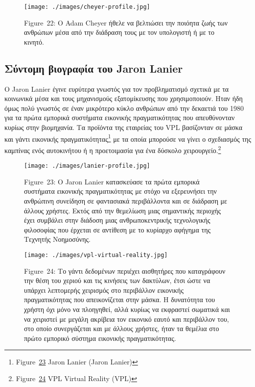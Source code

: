 \documentclass[
]{article}
\begin{document}
\leavevmode{}%
\begin{figure}
\hypertarget{fig:adam-cheyer-profile}{%
\centering
\texttt{[image: ./images/cheyer-profile.jpg]}
\caption{Figure~22: Ο Adam Cheyer ήθελε να βελτιώσει την ποιόητα ζωής
των ανθρώπων μέσα από την διάδραση τους με τον υπολογιστή ή με το
κινητό.}\label{fig:adam-cheyer-profile}
}
\end{figure}

\hypertarget{ux3c3ux3cdux3bdux3c4ux3bfux3bcux3b7-ux3b2ux3b9ux3bfux3b3ux3c1ux3b1ux3c6ux3afux3b1-ux3c4ux3bfux3c5-jaron-lanier}{%
\subsection{Σύντομη βιογραφία του Jaron
Lanier}\label{ux3c3ux3cdux3bdux3c4ux3bfux3bcux3b7-ux3b2ux3b9ux3bfux3b3ux3c1ux3b1ux3c6ux3afux3b1-ux3c4ux3bfux3c5-jaron-lanier}}

Ο Jaron Lanier έγινε ευρύτερα γνωστός για τον προβληματισμό σχετικά με
τα κοινωνικά μέσα και τους μηχανισμούς εξατομίκευσης που χρησιμοποιούν.
Ηταν ήδη όμως πολύ γνωστός σε έναν μικρότερο κύκλο ανθρώπων από την
δεκαετιά του 1980 για τα πρώτα εμπορικά συστήματα εικονικής
πραγματικότητας που απευθύνονταν κυρίως στην βιομηχανία. Τα προϊόντα της
εταιρείας του VPL βασίζονταν σε μάσκα και γάντι εικονικής
πραγματικότητας\footnote{Figure~\protect\hyperlink{fig:lanier-profile}{23}
  Jaron Lanier (Jaron Lanier)} με τα οποία μπορούσε να γίνει ο
σχεδιασμός της καμπίνας ενός αυτοκινήτου ή η προετοιμασία για ένα
δύσκολο χειρουργείο.\footnote{Figure~\protect\hyperlink{fig:vpl-virtual-reality}{24}
  VPL Virtual Reality (VPL)}

\leavevmode{}%
\begin{figure}
\hypertarget{fig:lanier-profile}{%
\centering
\texttt{[image: ./images/lanier-profile.jpg]}
\caption{Figure~23: Ο Jaron Lanier κατασκεύασε τα πρώτα εμπορικά
συστήματα εικονικής πραγματικότητας με στόχο να εξερευνήσει την
ανθρώπινη συνείδηση σε φαντασιακά περιβάλλοντα και σε διάδραση με άλλους
χρήστες. Εκτός από την θεμελίωση μιας σημαντικής περιοχής έχει συμβάλει
στην διάδοση μιας ανθρωποκεντρικής τεχνολογικής φιλοσοφίας που έρχεται
σε αντίθεση με το κυρίαρχο αφήγημα της Τεχνητής
Νοημοσύνης.}\label{fig:lanier-profile}
}
\end{figure}

\leavevmode{}%
\begin{figure}
\hypertarget{fig:vpl-virtual-reality}{%
\centering
\texttt{[image: ./images/vpl-virtual-reality.jpg]}
\caption{Figure~24: Το γάντι δεδομένων περιέχει αισθητήρες που
καταγράφουν την θέση του χεριού και τις κινήσεις των δακτύλων, έτσι ώστε
να υπάρχει λεπτομερής χειρισμός στο περιβάλλον εικονικής πραγματικότητας
που απεικονίζεται στην μάσκα. Η δυνατότητα του χρήστη όχι μόνο να
πλοηγηθεί, αλλά κυρίως να εκφραστεί σωματικά και να χειριστεί με μεγάλη
ακρίβεια τον εικονικό εαυτό και περιβάλλον του, στο οποίο συνεργάζεται
και με άλλους χρήστες, ήταν τα θεμέλια στο πρώτο εμπορικό σύστημα
εικονικής πραγματικότητας.}\label{fig:vpl-virtual-reality}
}
\end{figure}
\end{document}
